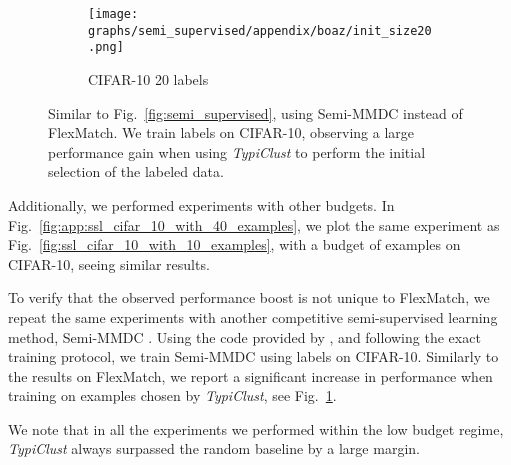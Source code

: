 \documentclass{article}
\begin{document}
\begin{figure}[htb!]
\begin{center}
    \begin{subfigure}{.25\textwidth}
      \centering
      \texttt{[image: graphs/semi\_supervised/appendix/boaz/init\_size20.png]}
    \vspace{-0.75cm}
    \caption{CIFAR-10 20 labels}
\end{subfigure}
\caption{Similar to Fig.~\ref{fig:semi_supervised}, using Semi-MMDC instead of FlexMatch. We train  labels on CIFAR-10, observing a large performance gain when using \emph{TypiClust} to perform the initial selection of the labeled data.}
\vspace{-0.3cm}
\label{fig:app:boaz_cifar10_20_labels}
\end{center}
\end{figure}

Additionally, we performed experiments with other budgets. In Fig.~\ref{fig:app:ssl_cifar_10_with_40_examples}, we plot the same experiment as Fig.~\ref{fig:ssl_cifar_10_with_10_examples}, with a budget of  examples on CIFAR-10, seeing similar results.

To verify that the observed performance boost is not unique to FlexMatch, we repeat the same experiments with another competitive semi-supervised learning method, 	
Semi-MMDC \citep{lerner2020boosting}. Using the code provided by \citet{lerner2020boosting}, and following the exact training protocol, we train Semi-MMDC using  labels on CIFAR-10. Similarly to the results on FlexMatch, we report a significant increase in performance when training on examples chosen by \emph{TypiClust}, see Fig.~\ref{fig:app:boaz_cifar10_20_labels}.


We note that in all the experiments we performed within the low budget regime, \emph{TypiClust} always surpassed the random baseline by a large margin.
\end{document}
